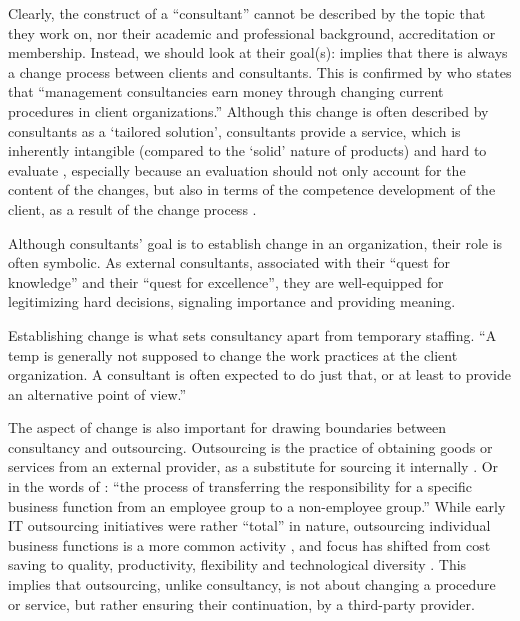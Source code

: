 \documentclass[12pt]{article}
\begin{document}
Clearly, the construct of a ``consultant'' cannot be described by the
topic that they work on, nor their academic and professional background,
accreditation or membership. Instead, we should look at their goal(s):
\citet[1]{werr1986} implies that there is always a change process
between clients and consultants. This is confirmed by
\citet[12]{kipping2000} who states that ``management consultancies earn
money through changing current procedures in client organizations.''
Although this change is often described by consultants as a `tailored
solution', consultants provide a service, which is inherently intangible
(compared to the `solid' nature of products) and hard to evaluate
\citep[ 348]{fincham1999}, especially because an evaluation should not
only account for the content of the changes, but also in terms of the
competence development of the client, as a result of the change process
\citep[ 17]{werr1986}.

Although consultants' goal is to establish change in an organization,
their role is often symbolic. As external consultants, associated with
their ``quest for knowledge'' and their ``quest for excellence'', they
are \citep[ 9-13]{pellegrin2006} well-equipped for legitimizing hard
decisions, signaling importance and providing meaning.

Establishing change is what sets consultancy apart from temporary
staffing. ``A temp is generally not supposed to change the work
practices at the client organization. A consultant is often expected to
do just that, or at least to provide an alternative point of view.''
\citep[ 5]{furusten2000}

The aspect of change is also important for drawing boundaries between
consultancy and outsourcing. Outsourcing is the practice of obtaining
goods or services from an external provider, as a substitute for
sourcing it internally \citep[ 2]{lacity2012}. Or in the words of
\citet[374]{zhu2001}: ``the process of transferring the responsibility
for a specific business function from an employee group to a
non-employee group.'' While early IT outsourcing initiatives were rather
``total'' \citet{willcocks1995} in nature, outsourcing individual
business functions is a more common activity \citep[ 377]{zhu2001}, and
focus has shifted from cost saving to quality, productivity, flexibility
and technological diversity \citep[ 185]{kirilov2012}. This implies that
outsourcing, unlike consultancy, is not about changing a procedure or
service, but rather ensuring their continuation, by a third-party
provider.
\end{document}
